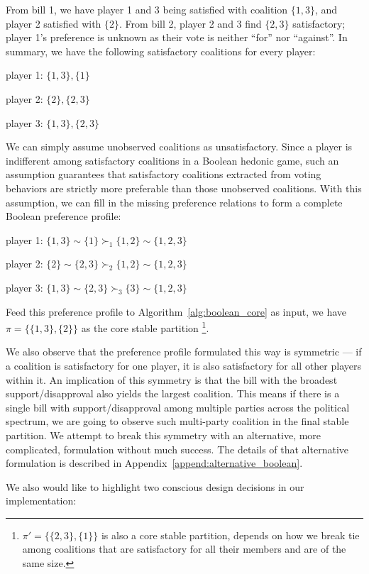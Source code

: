 From bill 1, we have player 1 and 3 being satisfied with coalition $\{1, 3\}$,
and player 2 satisfied with $\{2\}$.
From bill 2, player 2 and 3 find $\{2, 3\}$ satisfactory; player 1's preference
is unknown as their vote is neither ``for'' nor ``against''.
In summary, we have the following satisfactory coalitions for every player:

player 1: $\{1, 3\}, \{1\}$

player 2: $\{2\}, \{2, 3\}$

player 3: $\{1, 3\}, \{2, 3\}$

We can simply assume unobserved coalitions as unsatisfactory.
Since a player is indifferent among satisfactory coalitions in a Boolean hedonic
game, such an assumption guarantees that satisfactory coalitions extracted from
voting behaviors are strictly more preferable than those unobserved coalitions.
With this assumption, we can fill in the missing preference relations to
form a complete Boolean preference profile:

player 1: $\{1, 3\} \sim \{1\} \succ_1 \{1, 2\} \sim \{1, 2, 3\}$

player 2: $\{2\} \sim \{2, 3\} \succ_2 \{1, 2\} \sim \{1, 2, 3\}$

player 3: $\{1, 3\} \sim \{2, 3\} \succ_3 \{3\} \sim \{1, 2, 3\}$

Feed this preference profile to Algorithm~\ref{alg:boolean_core} as input, we
have $\pi = \{\{1, 3\}, \{2\}\}$ as the core stable partition
\footnote{$\pi' = \{\{2, 3\}, \{1\}\}$ is also a core stable partition, depends
on how we break tie among coalitions that are satisfactory for all their members
and are of the same size.}.

We also observe that the preference profile formulated this way is symmetric ---
if a coalition is satisfactory for one player, it is also satisfactory for all
other players within it.
An implication of this symmetry is that the bill with the broadest
support/disapproval also yields the largest coalition.
This means if there is a single bill with support/disapproval among multiple
parties across the political spectrum, we are going to observe such multi-party
coalition in the final stable partition.
We attempt to break this symmetry with an alternative, more complicated,
formulation without much success.
The details of that alternative formulation is described in
Appendix~\ref{append:alternative_boolean}.

We also would like to highlight two conscious design decisions in our
implementation:

